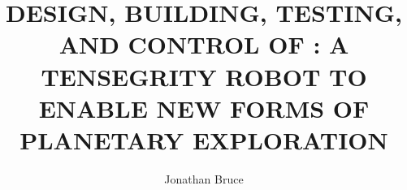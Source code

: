 \title{DESIGN, BUILDING, TESTING, AND CONTROL OF \SB{}: A TENSEGRITY ROBOT TO ENABLE NEW FORMS OF PLANETARY EXPLORATION}
\author{Jonathan Bruce}

\maketitle
